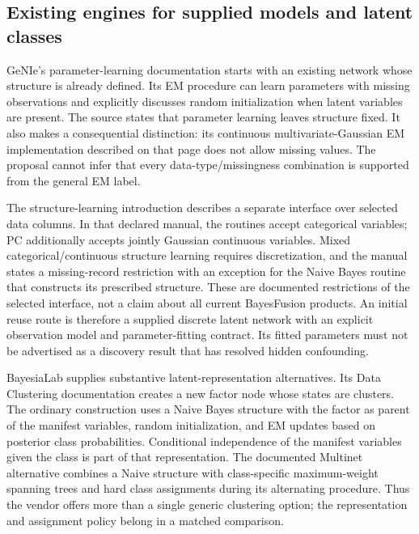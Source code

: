 \hypertarget{existing-engines-for-supplied-models-and-latent-classes}{%
\subsection{Existing engines for supplied models and latent
classes}\label{existing-engines-for-supplied-models-and-latent-classes}}

GeNIe's parameter-learning documentation starts with an existing network
whose structure is already defined. Its EM procedure can learn
parameters with missing observations and explicitly discusses random
initialization when latent variables are present. The source states that
parameter learning leaves structure fixed. It also makes a consequential
distinction: its continuous multivariate-Gaussian EM implementation
described on that page does not allow missing values. The proposal
cannot infer that every data-type/missingness combination is supported
from the general EM label. \citep{exec13_latent_genie_parameters}

The structure-learning introduction describes a separate interface over
selected data columns. In that declared manual, the routines accept
categorical variables; PC additionally accepts jointly Gaussian
continuous variables. Mixed categorical/continuous structure learning
requires discretization, and the manual states a missing-record
restriction with an exception for the Naive Bayes routine that
constructs its prescribed structure. These are documented restrictions
of the selected interface, not a claim about all current BayesFusion
products. An initial reuse route is therefore a supplied discrete latent
network with an explicit observation model and parameter-fitting
contract. Its fitted parameters must not be advertised as a discovery
result that has resolved hidden confounding.
\citep{exec13_latent_genie_structure,exec13_latent_genie_parameters}

BayesiaLab supplies substantive latent-representation alternatives. Its
Data Clustering documentation creates a new factor node whose states are
clusters. The ordinary construction uses a Naive Bayes structure with
the factor as parent of the manifest variables, random initialization,
and EM updates based on posterior class probabilities. Conditional
independence of the manifest variables given the class is part of that
representation. The documented Multinet alternative combines a Naive
structure with class-specific maximum-weight spanning trees and hard
class assignments during its alternating procedure. Thus the vendor
offers more than a single generic clustering option; the representation
and assignment policy belong in a matched comparison.
\citep{exec13_latent_bayesia_data}

